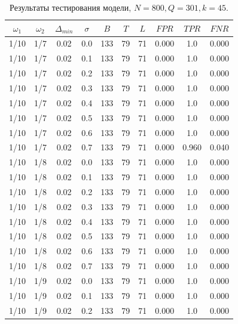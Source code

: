 \documentclass[specialist, substylefile = spbu.rtx,
			   subf, href, 12pt]{disser}
\begin{document}
\begin{table}[!hhh]
	\center
	\caption{Результаты тестирования модели, $ N = 800, Q=301, k=45 $.}
	\begin{tabular}{cccccccccc}
		\toprule
		$ \omega_1 $ & $ \omega_2 $ & $ \Delta_{min} $ & $ \sigma $ &    $ B $ &   $ T $ &   $ L $ &    $ FPR $ &    $ TPR $ &    $ FNR $ \\
		\midrule
		1/10 &   1/7 &     0.02 &     0.0 & 133 & 79 & 71 & 0.000 & 1.0 & 0.000 \\
		1/10 &   1/7 &     0.02 &     0.1 & 133 & 79 & 71 & 0.000 & 1.0 & 0.000 \\
		1/10 &   1/7 &     0.02 &     0.2 & 133 & 79 & 71 & 0.000 & 1.0 & 0.000 \\
		1/10 &   1/7 &     0.02 &     0.3 & 133 & 79 & 71 & 0.000 & 1.0 & 0.000 \\
		1/10 &   1/7 &     0.02 &     0.4 & 133 & 79 & 71 & 0.000 & 1.0 & 0.000 \\
		1/10 &   1/7 &     0.02 &     0.5 & 133 & 79 & 71 & 0.000 & 1.0 & 0.000 \\
		1/10 &   1/7 &     0.02 &     0.6 & 133 & 79 & 71 & 0.000 & 1.0 & 0.000 \\
		1/10 &   1/7 &     0.02 &     0.7 & 133 & 79 & 71 & 0.000 & 0.960 & 0.040 \\
		\hline
		1/10 &   1/8 &     0.02 &     0.0 & 133 & 79 & 71 & 0.000 & 1.0 & 0.000 \\
		1/10 &   1/8 &     0.02 &     0.1 & 133 & 79 & 71 & 0.000 & 1.0 & 0.000 \\
		1/10 &   1/8 &     0.02 &     0.2 & 133 & 79 & 71 & 0.000 & 1.0 & 0.000 \\
		1/10 &   1/8 &     0.02 &     0.3 & 133 & 79 & 71 & 0.000 & 1.0 & 0.000 \\
		1/10 &   1/8 &     0.02 &     0.4 & 133 & 79 & 71 & 0.000 & 1.0 & 0.000 \\
		1/10 &   1/8 &     0.02 &     0.5 & 133 & 79 & 71 & 0.000 & 1.0 & 0.000 \\
		1/10 &   1/8 &     0.02 &     0.6 & 133 & 79 & 71 & 0.000 & 1.0 & 0.000 \\
		1/10 &   1/8 &     0.02 &     0.7 & 133 & 79 & 71 & 0.000 & 1.0 & 0.000 \\
		\hline
		1/10 &   1/9 &     0.02 &     0.0 & 133 & 79 & 71 & 0.000 & 1.0 & 0.000 \\
		1/10 &   1/9 &     0.02 &     0.1 & 133 & 79 & 71 & 0.000 & 1.0 & 0.000 \\
		1/10 &   1/9 &     0.02 &     0.2 & 133 & 79 & 71 & 0.000 & 1.0 & 0.000 \\

\end{tabular}
\end{table}
\end{document}
